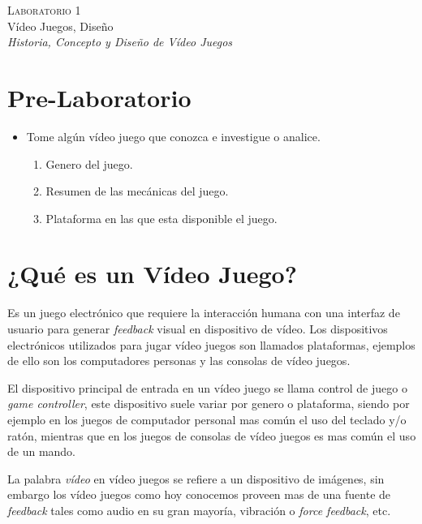 \begin{center}
\textsc{\Large Laboratorio 1}~\\
{\large Vídeo Juegos, Diseño}~\\
\emph{Historia, Concepto y Diseño de Vídeo Juegos}
\end{center}

\section{Pre-Laboratorio}
\begin{itemize}
\item Tome algún vídeo juego que conozca e investigue o analice.
\begin{enumerate}
  \item Genero del juego.
  \item Resumen de las mecánicas del juego.
  \item Plataforma en las que esta disponible el juego.
\end{enumerate}
\end{itemize}
\section{¿Qué es un Vídeo Juego?}
Es un juego electrónico que requiere la interacción humana con una interfaz de usuario para generar \emph{feedback} visual en dispositivo de vídeo. Los dispositivos electrónicos utilizados para jugar vídeo juegos son llamados plataformas, ejemplos de ello son los computadores personas y las consolas de vídeo juegos.

El dispositivo principal de entrada en un vídeo juego se llama control de juego o \emph{game controller}, este dispositivo suele variar por genero o plataforma, siendo por ejemplo en los juegos de computador personal mas común el uso del teclado y/o ratón, mientras que en los juegos de consolas de vídeo juegos es mas común el uso de un mando.

La palabra \emph{vídeo} en vídeo juegos se refiere a un dispositivo de imágenes, sin embargo los vídeo juegos como hoy conocemos proveen mas de una fuente de \emph{feedback} tales como audio en su gran mayoría, vibración o \emph{force feedback}, etc.


